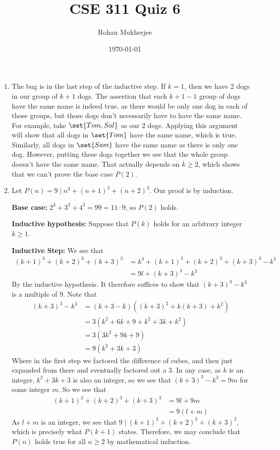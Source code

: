 \documentclass[12pt]{article}
\title{CSE 311 Quiz 6}
\date{\today}
\author{Rohan Mukherjee}
\theoremstyle{definition}
\theoremstyle{remark}
\begin{document}
	\maketitle
	\begin{enumerate}
		\item 
		The bug is in the last step of the inductive step. If $k = 1$, then we have 2 dogs in our group of $k+1$ dogs. The assertion that each $k+1-1$ group of dogs have the same name is indeed true, as there would be only one dog in each of those groups, but those dogs don't necessarily have to have the same name. For example, take $\set{Tom, Sal}$ as our 2 dogs. Applying this argument will show that all dogs in $\set{Tom}$ have the same name, which is true. Similarly, all dogs in $\set{Sam}$ have the same name as there is only one dog. However, putting these dogs together we see that the whole group doesn't have the same name. That actually depends on $k \geq 2$, which shows that we can't prove the base case $P(2)$.
		\item 
		Let $P(n) = 9 \mid n^3 + (n+1)^3 + (n+2)^3$. Our proof is by induction.
		
		\textbf{Base case: } $2^3+3^3+4^3=99 = 11 \cdot 9$, so $P(2)$ holds.
		
		\textbf{Inductive hypothesis: } Suppose that $P(k)$ holds for an arbitrary integer $k \geq 1$.
		
		\textbf{Inductive Step: } We see that
		\begin{align*}
			(k+1)^3+(k+2)^3+(k+3)^3 &= k^3 + (k+1)^3+(k+2)^3+(k+3)^3 - k^3 \\
			&= 9l + (k+3)^3-k^3
		\end{align*}
		By the inductive hypothesis. It therefore suffices to show that $(k+3)^3 - k^3$ is a multiple of 9. Note that
		\begin{align*}
			(k+3)^3 - k^3 &= (k+3-k)((k+3)^2+k(k+3)+k^2) \\
			&= 3(k^2+6k+9+k^2+3k+k^2) \\
			&= 3(3k^2+9k+9) \\
			&= 9(k^2+3k+3)
		\end{align*}
		Where in the first step we factored the difference of cubes, and then just expanded from there and eventually factored out a 3. In any case, as $k$ is an integer, $k^2+3k+3$ is also an integer, so we see that $(k+3)^3-k^3 = 9m$ for some integer $m$. So we see that
		\begin{align*}
			(k+1)^3+(k+2)^3+(k+3)^3 &= 9l + 9m \\
			&= 9(l+m)
		\end{align*}
		As $l+m$ is an integer, we see that $9 \mid (k+1)^3+(k+2)^3+(k+3)^3$, which is precisely what $P(k+1)$ states. Therefore, we may conclude that $P(n)$ holds true for all $n \geq 2$ by mathematical induction.
		

\end{enumerate}
\end{document}
